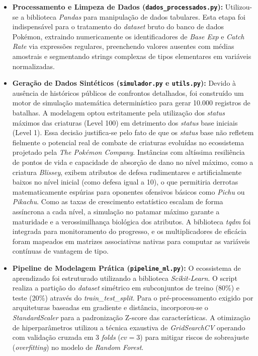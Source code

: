 \documentclass[12pt, a4paper]{article}
\begin{document}
\begin{itemize}
    \item \textbf{Processamento e Limpeza de Dados (\texttt{dados\_processados.py}):} Utilizou-se a biblioteca \textit{Pandas} para manipulação de dados tabulares. Esta etapa foi indispensável para o tratamento do \textit{dataset} bruto do banco de dados Pokémon, extraindo numericamente os identificadores de \textit{Base Exp} e \textit{Catch Rate} via expressões regulares, preenchendo valores ausentes com médias amostrais e segmentando strings complexas de tipos elementares em variáveis normalizadas.
    
    \item \textbf{Geração de Dados Sintéticos (\texttt{simulador.py} e \texttt{utils.py}):} Devido à ausência de históricos públicos de confrontos detalhados, foi construído um motor de simulação matemática determinístico para gerar 10.000 registros de batalhas. A modelagem optou estritamente pela utilização dos \textit{status} máximos das criaturas (Level 100) em detrimento dos \textit{status} base iniciais (Level 1). Essa decisão justifica-se pelo fato de que os \textit{status} base não refletem fielmente o potencial real de combate de criaturas evoluídas no ecossistema projetado pela \textit{The Pokémon Company}. Instâncias com altíssima resiliência de pontos de vida e capacidade de absorção de dano no nível máximo, como a criatura \textit{Blissey}, exibem atributos de defesa rudimentares e artificialmente baixos no nível inicial (como defesa igual a 10), o que permitiria derrotas matematicamente espúrias para oponentes ofensivos básicos como \textit{Pichu} ou \textit{Pikachu}. Como as taxas de crescimento estatístico escalam de forma assíncrona a cada nível, a simulação no patamar máximo garante a maturidade e a verossimilhança biológica dos atributos. A biblioteca \textit{tqdm} foi integrada para monitoramento do progresso, e os multiplicadores de eficácia foram mapeados em matrizes associativas nativas para computar as variáveis contínuas de vantagem de tipo.
    
    \item \textbf{Pipeline de Modelagem Prática (\texttt{pipeline\_ml.py}):} O ecossistema de aprendizado foi estruturado utilizando a biblioteca \textit{Scikit-Learn}. O script realiza a partição do \textit{dataset} simétrico em subconjuntos de treino (80\%) e teste (20\%) através do \textit{train\_test\_split}. Para o pré-processamento exigido por arquiteturas baseadas em gradiente e distância, incorporou-se o \textit{StandardScaler} para a padronização Z-score das características. A otimização de hiperparâmetros utilizou a técnica exaustiva de \textit{GridSearchCV} operando com validação cruzada em 3 \textit{folds} ($cv=3$) para mitigar riscos de sobreajuste (\textit{overfitting}) no modelo de \textit{Random Forest}. 
    

\end{itemize}
\end{document}
